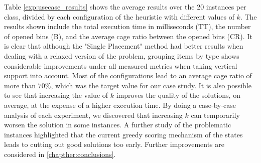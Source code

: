 Table \ref{exp:usecase_results} shows the average results over the 20 instances per class, divided by each configuration of the heuristic with different values of $k$.
The results shown include the total execution time in milliseconds (TT), the number of opened bins (B), and the average cage ratio between the opened bins (CR).
It is clear that although the "Single Placement" method had better results when dealing with a relaxed version of the problem, grouping items by type shows considerable improvements under all measured metrics when taking vertical support into account.
Most of the configurations lead to an average cage ratio of more than $70\%$, which was the target value for our case study.
It is also possible to see that increasing the value of $k$ improves the quality of the solutions, on average, at the expense of a higher execution time.
By doing a case-by-case analysis of each experiment, we discovered that increasing $k$ can temporarily worsen the solution in some instances. 
A further study of the problematic instances highlighted that the current greedy scoring mechanism of the states leads to cutting out good solutions too early. 
Further improvements are considered in \cref{chapther:conclusions}.
\label{exp:usecase_results}

